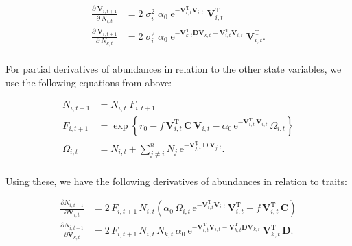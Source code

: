 \begin{equation*}
\begin{split}
    \frac{ \partial \: \mathbf{V}_{i,t+1} }{ \partial \: N_{i,t} } &=
        2 \; \sigma_i^2 \; \alpha_0 \;
        \textrm{e}^{ - \mathbf{V}_{i,t}^{\textrm{T}} \mathbf{V}_{i,t} }
        \; \mathbf{V}_{i,t}^{\textrm{T}} \\
    \frac{ \partial \: \mathbf{V}_{i,t+1} }{ \partial \: N_{k,t} } &=
        2 \; \sigma_i^2 \; \alpha_0 \;
        \textrm{e}^{ - \mathbf{V}_{k,t}^{\textrm{T}} \mathbf{D} \mathbf{V}_{k,t}
            - \mathbf{V}_{i,t}^{\textrm{T}} \mathbf{V}_{i,t} }
        \; \mathbf{V}_{i,t}^{\textrm{T}}
    \textrm{.} \\
\end{split}
\end{equation*}




For partial derivatives of abundances in relation to the other state variables,
we use the following equations from above:


\begin{equation*}
\begin{split}
    N_{i,t+1} &= N_{i,t} \; F_{i,t+1} \\
    F_{i,t+1} &=  \exp \left\{
        r_0 - f \, \mathbf{V}_{i,t}^{\text{T}} \, \mathbf{C} \, \mathbf{V}_{i,t} - 
        \alpha_0 \, \text{e}^{-\mathbf{V}_{i,t}^{\text{T}} \, \mathbf{V}_{i,t}} \,
        \Omega_{i,t}
    \right\} \\
    \Omega_{i,t} &= N_{i,t} + \sum_{j \ne i}^{n}{ N_j \:
        \text{e}^{- \mathbf{V}_{j,t}^{\text{T}} \, \mathbf{D} \, \mathbf{V}_{j,t} } }
    \textrm{.} \\
\end{split}
\end{equation*}



Using these, we have the following derivatives of abundances in relation
to traits:

\begin{equation*}
\begin{split}
    \frac{ \partial N_{i,t+1} }{ \partial \mathbf{V}_{i,t} } &= 
        2 \, F_{i,t+1} \,  N_{i,t}
        \left(
            \alpha_0 \, \Omega_{i,t} \, \text{e}^{ -\mathbf{V}_{i,t}^{\text{T}}
            \mathbf{V}_{i,t} } \, \mathbf{V}_{i,t}^{\text{T}}
            - f \, \mathbf{V}_{i,t}^{\text{T}} \, \mathbf{C}
        \right) \\
    \frac{ \partial N_{i,t+1} }{ \partial \mathbf{V}_{k,t} } &= 
        2 \, F_{i,t+1} \, N_{i,t} \, N_{k,t} \, \alpha_0 \: 
        \text{e}^{ -\mathbf{V}_{i,t}^{\text{T}} \mathbf{V}_{i,t} -
            \mathbf{V}_{k,t}^{\text{T}} \mathbf{D} \mathbf{V}_{k,t} } \:
        \mathbf{V}_{k,t}^{\text{T}} \, \mathbf{D}
    \textrm{.}
\end{split}
\end{equation*}

